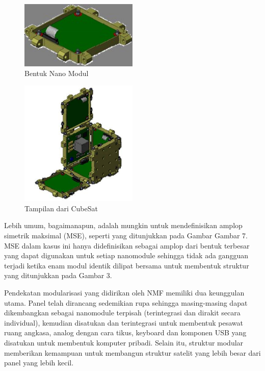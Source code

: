    \begin{figure}[ht]
\centerline{\includegraphics[width=0.5\textwidth]{figures/Ananomodule.jpg}}
  \caption{Bentuk Nano Modul}
  \label{Ananomodule}
  \end{figure}

   \begin{figure}[ht]
\centerline{\includegraphics[width=0.5\textwidth]{figures/ViewofCubeSat.png}}
  \caption{Tampilan dari CubeSat}
  \label{ViewofCubeSat}
  \end{figure}

Lebih umum, bagaimanapun, adalah mungkin untuk mendefinisikan amplop simetrik maksimal (MSE), seperti yang ditunjukkan pada Gambar Gambar 7. MSE dalam kasus ini hanya didefinisikan sebagai amplop dari bentuk terbesar yang dapat digunakan untuk setiap nanomodule sehingga tidak ada gangguan terjadi ketika enam modul identik dilipat bersama untuk membentuk struktur yang ditunjukkan pada Gambar 3.

Pendekatan modularisasi yang didirikan oleh NMF memiliki dua keunggulan utama. Panel telah dirancang sedemikian rupa sehingga masing-masing dapat dikembangkan sebagai nanomodule terpisah (terintegrasi dan dirakit secara individual), kemudian disatukan dan terintegrasi untuk membentuk pesawat ruang angkasa, analog dengan cara tikus, keyboard dan komponen USB yang disatukan untuk membentuk komputer pribadi. Selain itu, struktur modular memberikan kemampuan untuk membangun struktur satelit yang lebih besar dari panel yang lebih kecil.